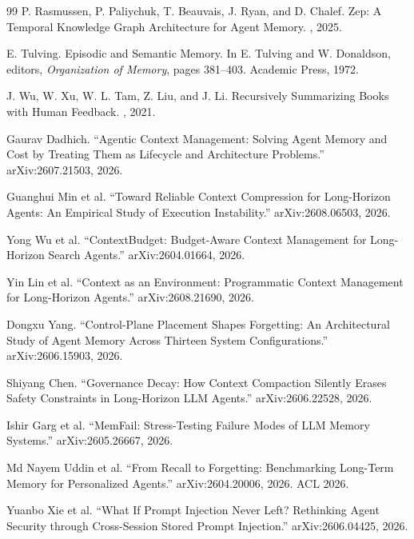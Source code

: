 \documentclass[11pt]{book}
\begin{document}
\begin{thebibliography}{99}
P. Rasmussen, P. Paliychuk, T. Beauvais, J. Ryan, and D. Chalef.
\newblock Zep: A Temporal Knowledge Graph Architecture for Agent Memory.
, 2025.

E. Tulving.
\newblock Episodic and Semantic Memory.
\newblock In E. Tulving and W. Donaldson, editors, {\em Organization of Memory}, pages 381--403. Academic Press, 1972.

J. Wu, W. Xu, W. L. Tam, Z. Liu, and J. Li.
\newblock Recursively Summarizing Books with Human Feedback.
, 2021.


Gaurav Dadhich.
``Agentic Context Management: Solving Agent Memory and Cost by Treating Them as Lifecycle and Architecture Problems.''
arXiv:2607.21503, 2026.

Guanghui Min et al.
``Toward Reliable Context Compression for Long-Horizon Agents: An Empirical Study of Execution Instability.''
arXiv:2608.06503, 2026.

Yong Wu et al.
``ContextBudget: Budget-Aware Context Management for Long-Horizon Search Agents.''
arXiv:2604.01664, 2026.

Yin Lin et al.
``Context as an Environment: Programmatic Context Management for Long-Horizon Agents.''
arXiv:2608.21690, 2026.

Dongxu Yang.
``Control-Plane Placement Shapes Forgetting: An Architectural Study of Agent Memory Across Thirteen System Configurations.''
arXiv:2606.15903, 2026.

Shiyang Chen.
``Governance Decay: How Context Compaction Silently Erases Safety Constraints in Long-Horizon LLM Agents.''
arXiv:2606.22528, 2026.

Ishir Garg et al.
``MemFail: Stress-Testing Failure Modes of LLM Memory Systems.''
arXiv:2605.26667, 2026.

Md Nayem Uddin et al.
``From Recall to Forgetting: Benchmarking Long-Term Memory for Personalized Agents.''
arXiv:2604.20006, 2026. ACL 2026.

Yuanbo Xie et al.
``What If Prompt Injection Never Left? Rethinking Agent Security through Cross-Session Stored Prompt Injection.''
arXiv:2606.04425, 2026.


\end{thebibliography}
\end{document}
